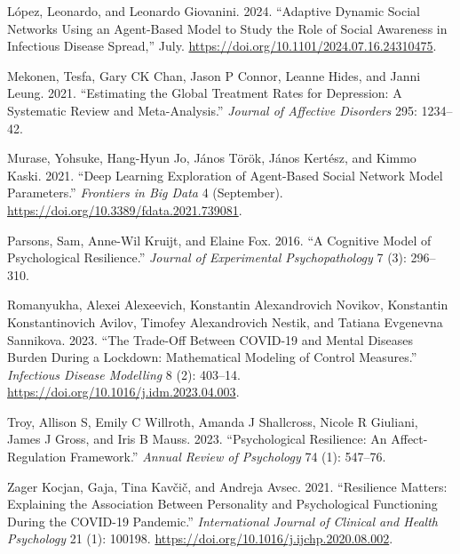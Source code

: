 \documentclass[
  letterpaper,
  DIV=11,
  numbers=noendperiod]{scrartcl}
\newlength{\cslhangindent}
\newenvironment{CSLReferences}[2] %
 {\begin{list}{}{%
  \setlength{\itemindent}{0pt}
  \setlength{\leftmargin}{0pt}
  \setlength{\parsep}{0pt}
  \ifodd #1
   \setlength{\leftmargin}{\cslhangindent}
   \setlength{\itemindent}{-1\cslhangindent}
  \fi
  \setlength{\itemsep}{#2\baselineskip}}}
 {\end{list}}
\begin{document}
\begin{CSLReferences}{1}{0}
López, Leonardo, and Leonardo Giovanini. 2024. {``Adaptive Dynamic
Social Networks Using an Agent-Based Model to Study the Role of Social
Awareness in Infectious Disease Spread,''} July.
\url{https://doi.org/10.1101/2024.07.16.24310475}.

Mekonen, Tesfa, Gary CK Chan, Jason P Connor, Leanne Hides, and Janni
Leung. 2021. {``Estimating the Global Treatment Rates for Depression: A
Systematic Review and Meta-Analysis.''} \emph{Journal of Affective
Disorders} 295: 1234--42.

Murase, Yohsuke, Hang-Hyun Jo, János Török, János Kertész, and Kimmo
Kaski. 2021. {``Deep Learning Exploration of Agent-Based Social Network
Model Parameters.''} \emph{Frontiers in Big Data} 4 (September).
\url{https://doi.org/10.3389/fdata.2021.739081}.

Parsons, Sam, Anne-Wil Kruijt, and Elaine Fox. 2016. {``A Cognitive
Model of Psychological Resilience.''} \emph{Journal of Experimental
Psychopathology} 7 (3): 296--310.

Romanyukha, Alexei Alexeevich, Konstantin Alexandrovich Novikov,
Konstantin Konstantinovich Avilov, Timofey Alexandrovich Nestik, and
Tatiana Evgenevna Sannikova. 2023. {``The Trade-Off Between COVID-19 and
Mental Diseases Burden During a Lockdown: Mathematical Modeling of
Control Measures.''} \emph{Infectious Disease Modelling} 8 (2): 403--14.
\url{https://doi.org/10.1016/j.idm.2023.04.003}.

Troy, Allison S, Emily C Willroth, Amanda J Shallcross, Nicole R
Giuliani, James J Gross, and Iris B Mauss. 2023. {``Psychological
Resilience: An Affect-Regulation Framework.''} \emph{Annual Review of
Psychology} 74 (1): 547--76.

Zager Kocjan, Gaja, Tina Kavčič, and Andreja Avsec. 2021. {``Resilience
Matters: Explaining the Association Between Personality and
Psychological Functioning During the COVID-19 Pandemic.''}
\emph{International Journal of Clinical and Health Psychology} 21 (1):
100198. \url{https://doi.org/10.1016/j.ijchp.2020.08.002}.

\end{CSLReferences}
\end{document}
